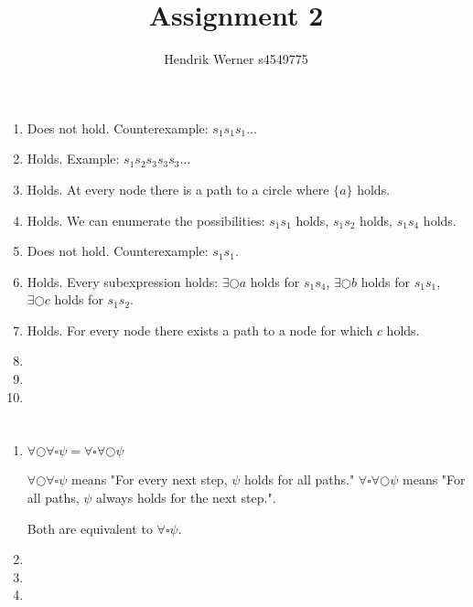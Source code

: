 \documentclass[12pt, a4paper]{article}
\title{Assignment 2}
\author{Hendrik Werner s4549775}
\begin{document}
\maketitle

\section{} %
\begin{enumerate}[a]
	\item %
	Does not hold. Counterexample: $s_1 s_1 s_1 \dots$
	\item %
	Holds. Example: $s_1 s_2 s_3 s_3 s_3 \dots$
	\item %
	Holds. At every node there is a path to a circle where $\{a\}$ holds.
	\item %
	Holds. We can enumerate the possibilities: $s_1 s_1$ holds, $s_1 s_2$ holds, $s_1 s_4$ holds.
	\item %
	Does not hold. Counterexample: $s_1 s_1$.
	\item %
	Holds. Every subexpression holds: $\exists \bigcirc a$ holds for $s_1 s_4$, $\exists \bigcirc b$ holds for $s_1 s_1$, $\exists \bigcirc c$ holds for $s_1 s_2$.
	\item %
	Holds. For every node there exists a path to a node for which $c$ holds.
	\item %
	\item %
	\item %
\end{enumerate}

\section{} %
\begin{enumerate}[a]
	\item %
	$\forall \bigcirc \forall \square \psi = \forall \square \forall \bigcirc \psi$

	$\forall \bigcirc \forall \square \psi$ means "For every next step, $\psi$ holds for all paths." $\forall \square \forall \bigcirc \psi$ means "For all paths, $\psi$ always holds for the next step.".

	Both are equivalent to $\forall \square \psi$.
	\item %
	\item %
	\item %
\end{enumerate}
\end{document}

